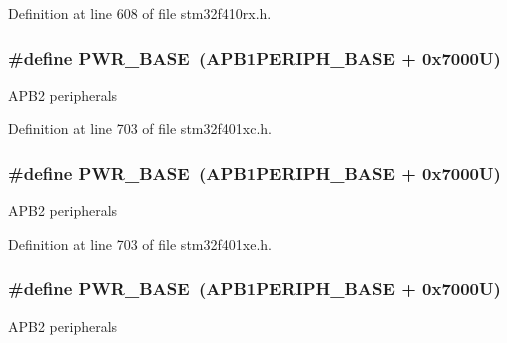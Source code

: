 Definition at line 608 of file stm32f410rx.\+h.

\subsubsection[{\texorpdfstring{P\+W\+R\+\_\+\+B\+A\+SE}{PWR_BASE}}]{\setlength{\rightskip}{0pt plus 5cm}\#define P\+W\+R\+\_\+\+B\+A\+SE~({\bf A\+P\+B1\+P\+E\+R\+I\+P\+H\+\_\+\+B\+A\+SE} + 0x7000\+U)}\hypertarget{group___peripheral__registers__structures_gac691ec23dace8b7a649a25acb110217a}{}\label{group___peripheral__registers__structures_gac691ec23dace8b7a649a25acb110217a}
A\+P\+B2 peripherals 

Definition at line 703 of file stm32f401xc.\+h.

\subsubsection[{\texorpdfstring{P\+W\+R\+\_\+\+B\+A\+SE}{PWR_BASE}}]{\setlength{\rightskip}{0pt plus 5cm}\#define P\+W\+R\+\_\+\+B\+A\+SE~({\bf A\+P\+B1\+P\+E\+R\+I\+P\+H\+\_\+\+B\+A\+SE} + 0x7000\+U)}\hypertarget{group___peripheral__registers__structures_gac691ec23dace8b7a649a25acb110217a}{}\label{group___peripheral__registers__structures_gac691ec23dace8b7a649a25acb110217a}
A\+P\+B2 peripherals 

Definition at line 703 of file stm32f401xe.\+h.

\subsubsection[{\texorpdfstring{P\+W\+R\+\_\+\+B\+A\+SE}{PWR_BASE}}]{\setlength{\rightskip}{0pt plus 5cm}\#define P\+W\+R\+\_\+\+B\+A\+SE~({\bf A\+P\+B1\+P\+E\+R\+I\+P\+H\+\_\+\+B\+A\+SE} + 0x7000\+U)}\hypertarget{group___peripheral__registers__structures_gac691ec23dace8b7a649a25acb110217a}{}\label{group___peripheral__registers__structures_gac691ec23dace8b7a649a25acb110217a}
A\+P\+B2 peripherals 

